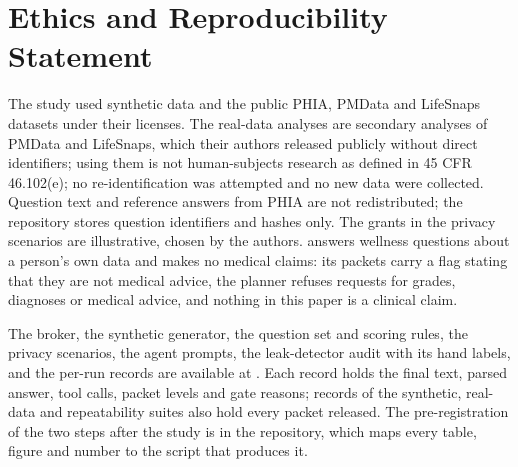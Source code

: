 \begingroup\sloppy
\section*{Ethics and Reproducibility Statement}\label{sec:ethics}

The study used synthetic data and the public PHIA, PMData and LifeSnaps datasets under their licenses. The real-data
analyses are secondary analyses of PMData and LifeSnaps, which their authors released publicly without direct
identifiers; using them is not human-subjects research as defined in 45 CFR 46.102(e); no re-identification was
attempted and no new data were collected. Question text and reference
answers from PHIA are not redistributed; the repository stores question identifiers and hashes only. The grants in
the privacy scenarios are illustrative, chosen by the authors. \sys{} answers wellness questions about a person's own
data and makes no medical claims: its packets carry a flag stating that they are not medical advice, the planner
refuses requests for grades, diagnoses or medical advice, and nothing in this paper is a clinical claim.

The broker, the synthetic generator, the question set and scoring rules, the privacy scenarios, the agent prompts,
the leak-detector audit with its hand labels, and the per-run records are available at \codeurl{}. Each record holds
the final text, parsed answer, tool calls, packet levels and gate reasons; records of the synthetic, real-data and
repeatability suites also hold every packet released. The pre-registration of the two steps after the study is in
the repository, which maps every table, figure and number to the script that produces it.
\par\endgroup
